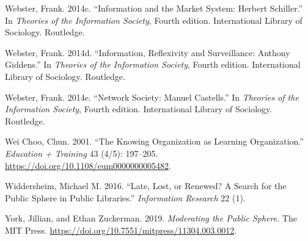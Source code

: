 \documentclass[
  letterpaper,
  DIV=11,
  numbers=noendperiod]{scrreprt}
\newlength{\cslhangindent}
\newenvironment{CSLReferences}[2] %
 {\begin{list}{}{%
  \setlength{\itemindent}{0pt}
  \setlength{\leftmargin}{0pt}
  \setlength{\parsep}{0pt}
  \ifodd #1
   \setlength{\leftmargin}{\cslhangindent}
   \setlength{\itemindent}{-1\cslhangindent}
  \fi
  \setlength{\itemsep}{#2\baselineskip}}}
 {\end{list}}
\begin{document}
\begin{CSLReferences}{1}{1}
Webster, Frank. 2014c. {``Information and the Market System: {Herbert}
{Schiller}.''} In \emph{Theories of the Information Society}, Fourth
edition. International Library of Sociology. Routledge.

Webster, Frank. 2014d. {``Information, Reﬂexivity and Surveillance:
{Anthony} {Giddens}.''} In \emph{Theories of the Information Society},
Fourth edition. International Library of Sociology. Routledge.

Webster, Frank. 2014e. {``Network Society: {Manuel} {Castells}.''} In
\emph{Theories of the Information Society}, Fourth edition.
International Library of Sociology. Routledge.

Wei Choo, Chun. 2001. {``The Knowing Organization as Learning
Organization.''} \emph{Education + Training} 43 (4/5): 197--205.
\url{https://doi.org/10.1108/eum0000000005482}.

Widdersheim, Michael M. 2016. {``Late, Lost, or Renewed? A Search for
the Public Sphere in Public Libraries.''} \emph{Information Research} 22
(1).

York, Jillian, and Ethan Zuckerman. 2019. \emph{Moderating the Public
Sphere}. The MIT Press.
\url{https://doi.org/10.7551/mitpress/11304.003.0012}.

\end{CSLReferences}
\end{document}
